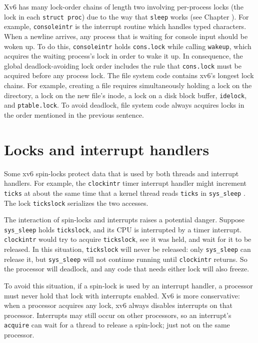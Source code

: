 Xv6 has many lock-order chains of length two involving
per-process locks
(the lock in each
\lstinline{struct proc})
due to the way that
\lstinline{sleep}
works (see Chapter
\*[CH:SCHED]).
For example,
\lstinline{consoleintr}
is the interrupt routine which handles typed characters.
When a newline arrives, any process that is waiting for
console input should be woken up.
To do this,
\lstinline{consoleintr}
holds
\lstinline{cons.lock}
while calling 
\lstinline{wakeup},
which acquires 
the waiting process's lock in order to wake it up.
In consequence, the global deadlock-avoiding
lock order includes the rule that
\lstinline{cons.lock}
must be acquired before any process lock.
The file system code contains xv6's longest lock chains.
For example, creating a file requires simultaneously
holding a lock on the directory, a lock on the new file's inode,
a lock on a disk block buffer, 
\lstinline{idelock},
and
\lstinline{ptable.lock}.
To avoid deadlock, file system code always acquires locks in the order 
mentioned in the previous sentence.
\section{Locks and interrupt handlers}
Some xv6 spin-locks protect data that is used by
both threads and interrupt handlers.
For example, the
\lstinline{clockintr}
timer interrupt handler might increment
\lstinline{ticks} 
at about the same time that a kernel
thread reads
\lstinline{ticks} 
in
\lstinline{sys_sleep}
.
The lock
\lstinline{tickslock}
serializes the two accesses.

The interaction of spin-locks and interrupts raises a potential danger.
Suppose
\lstinline{sys_sleep}
holds
\lstinline{tickslock},
and its CPU is interrupted by a timer interrupt.
\lstinline{clockintr}
would try to acquire
\lstinline{tickslock},
see it was held, and wait for it to be released.
In this situation,
\lstinline{tickslock}
will never be released: only
\lstinline{sys_sleep}
can release it, but
\lstinline{sys_sleep}
will not continue running until
\lstinline{clockintr}
returns.
So the processor will deadlock, and any code
that needs either lock will also freeze.

To avoid this situation, if a spin-lock is used by an interrupt handler,
a processor must never hold that lock with interrupts enabled.
Xv6 is more conservative: when a processor acquires any
lock, xv6 always disables interrupts on that processor.
Interrupts may still occur on other processors, so 
an interrupt's
\lstinline{acquire}
can wait for a thread to release a spin-lock; just not on the same processor.


